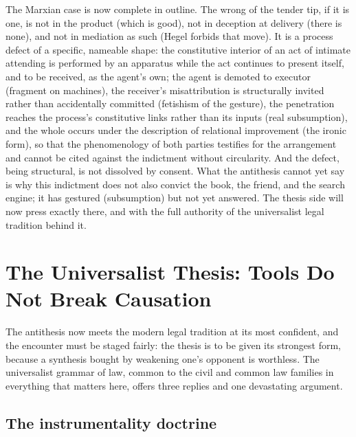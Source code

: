 \documentclass[11pt,a4paper]{article}
\begin{document}
The Marxian case is now complete in outline. The wrong of the tender tip, if it is one, is not in the product (which is good), not in deception at delivery (there is none), and not in mediation as such (Hegel forbids that move). It is a process defect of a specific, nameable shape: the constitutive interior of an act of intimate attending is performed by an apparatus while the act continues to present itself, and to be received, as the agent's own; the agent is demoted to executor (fragment on machines), the receiver's misattribution is structurally invited rather than accidentally committed (fetishism of the gesture), the penetration reaches the process's constitutive links rather than its inputs (real subsumption), and the whole occurs under the description of relational improvement (the ironic form), so that the phenomenology of both parties testifies for the arrangement and cannot be cited against the indictment without circularity. And the defect, being structural, is not dissolved by consent. What the antithesis cannot yet say is why this indictment does not also convict the book, the friend, and the search engine; it has gestured (subsumption) but not yet answered. The thesis side will now press exactly there, and with the full authority of the universalist legal tradition behind it.
\section{The Universalist Thesis: Tools Do Not Break Causation}
\label{p02:sec:thesis}

The antithesis now meets the modern legal tradition at its most confident, and the encounter must be staged fairly: the thesis is to be given its strongest form, because a synthesis bought by weakening one's opponent is worthless. The universalist grammar of law, common to the civil and common law families in everything that matters here, offers three replies and one devastating argument.

\subsection{The instrumentality doctrine}
\label{p02:sec:thesis-instrument}
\end{document}
